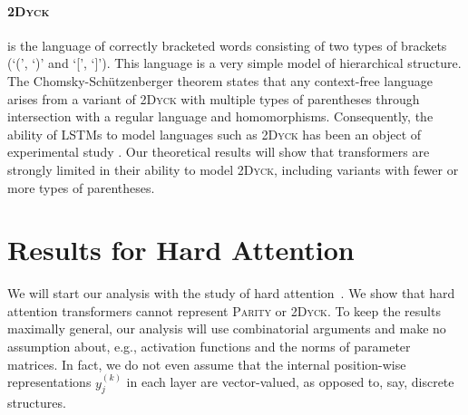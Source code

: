 \documentclass[11pt,a4paper]{article}
\newcounter{theorem}
\begin{document}
%
%


\paragraph{\textsc{2Dyck}} is the language of correctly bracketed words consisting of two types of brackets (`(', `)' and `[', `]').
This language is a very simple model of hierarchical structure.
The Chomsky-Sch{\"u}tzenberger theorem \cite{chomsky1963algebraic} states that any context-free language arises from a variant of \textsc{2Dyck} with multiple types of parentheses through intersection with a regular language and homomorphisms.
Consequently, the ability of LSTMs to model languages such as \textsc{2Dyck} has been an object of experimental study \cite{sennhauser2018evaluating,skachkova2018closing,bernardy2018can}.
Our theoretical results will show that transformers are strongly limited in their ability to model \textsc{2Dyck}, including variants with fewer or more types of parentheses.




\section{Results for Hard Attention}\label{sec:hard}

We will start our analysis with the study of hard attention~\cite{perez2019turing}.
We show that hard attention transformers cannot represent \textsc{Parity} or \textsc{2Dyck}. %
To keep the results maximally general, our analysis will use combinatorial arguments and make no assumption about, e.g., activation functions and the norms of parameter matrices.
In fact, we do not even assume that the internal position-wise representations $y_{j}^{(k)}$ in each layer are vector-valued, as opposed to, say, discrete structures.
\end{document}
